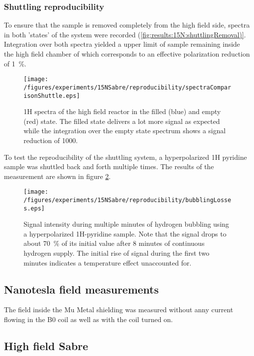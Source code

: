         \subsubsection{Shuttling reproducibility}
        To ensure that the sample is removed completely from the high field side, spectra in both 'states' of the system were recorded (\ref{fig:results:15N:shuttlingRemoval)}. Integration over both spectra yielded a upper limit of sample remaining inside the high field chamber of which corresponds to an effective polarization reduction of \SI{1}{\percent}.
        \begin{figure}
            \label{fig:results:15N:shuttlingRemoval}
            \centering
            \texttt{[image: /figures/experiments/15NSabre/reproducibility/spectraComparisonShuttle.eps]}
            \caption{1H spectra of the high field reactor in the filled (blue) and empty (red) state. The filled state delivers a lot more signal as expected while the integration over the empty state spectrum shows a signal reduction of 1000.}
        \end{figure}
        To test the reproducibility of the shuttling system, a hyperpolarized 1H pyridine sample was shuttled back and forth multiple times. The results of the measurement are shown in figure \ref{fig:results:15N:shuttlingReproducibility}. 
        \begin{figure}
            \label{fig:results:15N:shuttlingReproducibility}
            \centering
            \texttt{[image: /figures/experiments/15NSabre/reproducibility/bubblingLosses.eps]}
            \caption{Signal intensity during multiple minutes of hydrogen bubbling using a hyperpolarized 1H-pyridine sample. Note that the signal drops to about \SI{70}{\percent} of its initial value after 8 minutes of continuous hydrogen supply. The initial rise of signal during the first two minutes indicates a temperature effect unaccounted for.}
        \end{figure}
    \subsection{Nanotesla field measurements}
        The field inside the Mu Metal shielding was measured without anny current flowing in the B0 coil as well as with the coil turned on. 
    \subsection{High field Sabre}
